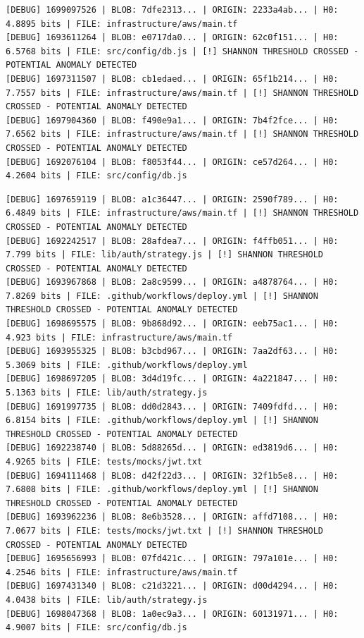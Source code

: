 \documentclass[12pt, a4paper, oneside]{report}
\begin{document}
\begin{lstlisting}[basicstyle=\tiny\ttfamily]
[DEBUG] 1699097526 | BLOB: 7dfe2313... | ORIGIN: 2233a4ab... | H0: 4.8895 bits | FILE: infrastructure/aws/main.tf
[DEBUG] 1693611264 | BLOB: e0717da0... | ORIGIN: 62c0f151... | H0: 6.5768 bits | FILE: src/config/db.js | [!] SHANNON THRESHOLD CROSSED - POTENTIAL ANOMALY DETECTED
[DEBUG] 1697311507 | BLOB: cb1edaed... | ORIGIN: 65f1b214... | H0: 7.7557 bits | FILE: infrastructure/aws/main.tf | [!] SHANNON THRESHOLD CROSSED - POTENTIAL ANOMALY DETECTED
[DEBUG] 1697904360 | BLOB: f490e9a1... | ORIGIN: 7b4f2fce... | H0: 7.6562 bits | FILE: infrastructure/aws/main.tf | [!] SHANNON THRESHOLD CROSSED - POTENTIAL ANOMALY DETECTED
[DEBUG] 1692076104 | BLOB: f8053f44... | ORIGIN: ce57d264... | H0: 4.2604 bits | FILE: src/config/db.js
\end{lstlisting}
\begin{lstlisting}[basicstyle=\tiny\ttfamily]
[DEBUG] 1697659119 | BLOB: a1c36447... | ORIGIN: 2590f789... | H0: 6.4849 bits | FILE: infrastructure/aws/main.tf | [!] SHANNON THRESHOLD CROSSED - POTENTIAL ANOMALY DETECTED
[DEBUG] 1692242517 | BLOB: 28afdea7... | ORIGIN: f4ffb051... | H0: 7.799 bits | FILE: lib/auth/strategy.js | [!] SHANNON THRESHOLD CROSSED - POTENTIAL ANOMALY DETECTED
[DEBUG] 1693967868 | BLOB: 2a8c9599... | ORIGIN: a4878764... | H0: 7.8269 bits | FILE: .github/workflows/deploy.yml | [!] SHANNON THRESHOLD CROSSED - POTENTIAL ANOMALY DETECTED
[DEBUG] 1698695575 | BLOB: 9b868d92... | ORIGIN: eeb75ac1... | H0: 4.923 bits | FILE: infrastructure/aws/main.tf
[DEBUG] 1693955325 | BLOB: b3cbd967... | ORIGIN: 7aa2df63... | H0: 5.3069 bits | FILE: .github/workflows/deploy.yml
[DEBUG] 1698697205 | BLOB: 3d4d19fc... | ORIGIN: 4a221847... | H0: 5.1363 bits | FILE: lib/auth/strategy.js
[DEBUG] 1691997735 | BLOB: dd0d2843... | ORIGIN: 7409fdfd... | H0: 6.8154 bits | FILE: .github/workflows/deploy.yml | [!] SHANNON THRESHOLD CROSSED - POTENTIAL ANOMALY DETECTED
[DEBUG] 1692238740 | BLOB: 5d88265d... | ORIGIN: ed3819d6... | H0: 4.9265 bits | FILE: tests/mocks/jwt.txt
[DEBUG] 1694111468 | BLOB: d42f22d3... | ORIGIN: 32f1b5e8... | H0: 7.6808 bits | FILE: .github/workflows/deploy.yml | [!] SHANNON THRESHOLD CROSSED - POTENTIAL ANOMALY DETECTED
[DEBUG] 1693962236 | BLOB: 8e6b3528... | ORIGIN: affd7108... | H0: 7.0677 bits | FILE: tests/mocks/jwt.txt | [!] SHANNON THRESHOLD CROSSED - POTENTIAL ANOMALY DETECTED
[DEBUG] 1695656993 | BLOB: 07fd421c... | ORIGIN: 797a101e... | H0: 4.2546 bits | FILE: infrastructure/aws/main.tf
[DEBUG] 1697431340 | BLOB: c21d3221... | ORIGIN: d00d4294... | H0: 4.0438 bits | FILE: lib/auth/strategy.js
[DEBUG] 1698047368 | BLOB: 1a0ec9a3... | ORIGIN: 60131971... | H0: 4.9007 bits | FILE: src/config/db.js

\end{lstlisting}
\end{document}
